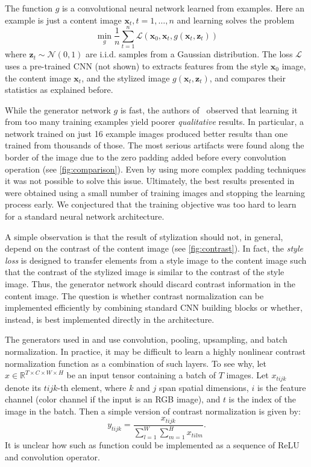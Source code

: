 \documentclass{article}
\newcommand{\bx}{\mathbf{x}}
\newcommand{\bz}{\mathbf{z}}
\begin{document}
The function $g$ is a convolutional neural network learned from examples. Here an example is just a content image $\bx_t,t=1,\dots,n$ and learning solves the problem
$$
\min_{g} \frac{1}{n} \sum_{t=1}^n
\mathcal{L}(\bx_0,\bx_t,g(\bx_t,\bz_t))
$$
where $\bz_t \sim \mathcal{N}(0,1)$ are i.i.d. samples from a Gaussian distribution. The loss $\mathcal{L}$ uses a pre-trained CNN (not shown) to extracts features from the style $\bx_0$ image, the content image $\bx_t$, and the stylized image $g(\bx_t,\bz_t)$, and compares their statistics as explained before.

While the generator network $g$ is fast, the authors of~\cite{DBLP:conf/icml/UlyanovLVL16} observed that learning it from too many training examples yield poorer \emph{qualitative} results. In particular, a network trained on just 16 example images produced better results than one trained from thousands of those. The most serious artifacts were found along the border of the image due to the zero padding added before every convolution operation (see \cref{fig:comparison}). Even by using more complex padding techniques it was not possible to solve this issue. Ultimately, the best results presented in \cite{DBLP:conf/icml/UlyanovLVL16} were obtained using a small number of training images and stopping the learning process early. We conjectured that the training objective was too hard to learn for a standard neural network architecture.
    
A simple observation is that the result of stylization should not, in general, depend on the contrast of the content image (see \cref{fig:contrast}). In fact, the \textit{style loss} is designed to transfer elements from a style image to the content image such that the contrast of the stylized image is similar to the contrast of the style image. Thus, the generator network should discard contrast information in the content image. The question is whether contrast normalization can be implemented efficiently by combining standard CNN building blocks or whether, instead, is best implemented directly in the architecture.

The generators used in \cite{DBLP:conf/icml/UlyanovLVL16} and \cite{DBLP:journals/corr/JohnsonAL16} use convolution, pooling, upsampling, and batch normalization. In practice, it may be difficult to learn a highly nonlinear contrast normalization function as a combination of such layers. To see why, let $x\in\mathbb{R}^{T \times C \times W \times H}$ be an input tensor containing a batch of $T$ images. Let $x_{tijk}$ denote its $tijk$-th element, where $k$ and $j$ span spatial dimensions, $i$ is the feature channel (color channel if the input is an RGB image), and $t$ is the index of the image in the batch. Then a simple version of contrast normalization is given by: 
%
\begin{equation}\label{eq:contrast}
    y_{tijk} =  \frac{x_{tijk}}{\sum_{l=1}^W \sum_{m=1}^H x_{tilm}}.
\end{equation}
It is unclear how such as function could be implemented as a sequence of ReLU and convolution operator.
\end{document}
